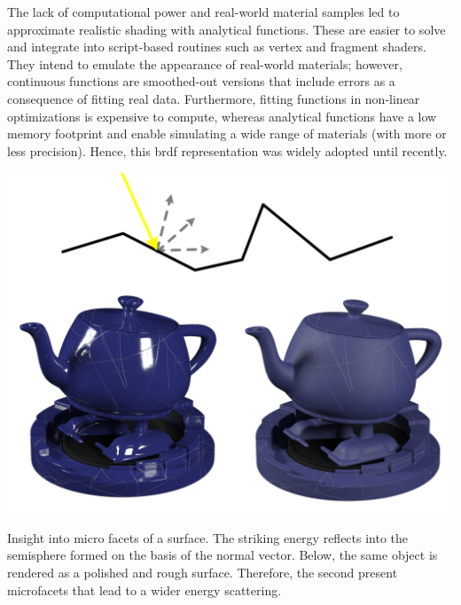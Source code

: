 The lack of computational power and real-world material samples led to approximate realistic shading with analytical functions. These are easier to solve and integrate into script-based routines such as vertex and fragment shaders. They intend to emulate the appearance of real-world materials; however, continuous functions are smoothed-out versions that include errors as a consequence of fitting real data. Furthermore, fitting functions in non-linear optimizations is expensive to compute, whereas analytical functions have a low memory footprint and enable simulating a wide range of materials (with more or less precision). Hence, this \acrshort{brdf} representation was widely adopted until recently. 

\begin{marginfigure}[3cm]
	\includegraphics{figs/fundamentals/microfacets.png}
	\caption{Insight into micro facets of a surface. The striking energy reflects into the semisphere formed on the basis of the normal vector. Below, the same object is rendered as a polished and rough surface. Therefore, the second present microfacets that lead to a wider energy scattering.}
	\label{fig:microfacets}
\end{marginfigure}
